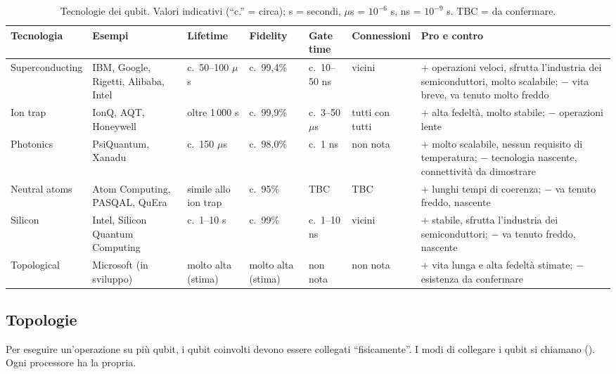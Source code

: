 \begin{table}[ht]
\centering
\footnotesize
\caption{Tecnologie dei qubit. Valori indicativi (``c.'' = circa); s = secondi, $\mu$s = $10^{-6}$ s, ns = $10^{-9}$ s.
TBC = da confermare.}
\label{tab:qse-tecnologie}
\begin{tabularx}{\linewidth}{>{\raggedright\arraybackslash}p{1.75cm}>{\raggedright\arraybackslash}p{1.8cm}>{\raggedright\arraybackslash}p{1.25cm}>{\raggedright\arraybackslash}p{1.05cm}>{\raggedright\arraybackslash}p{1.1cm}>{\raggedright\arraybackslash}p{1.15cm}>{\raggedright\arraybackslash}X}
\toprule
Tecnologia & Esempi & Lifetime & Fidelity & Gate time & Connes\-sioni & Pro e contro \\
\midrule
Supercon\-ducting & IBM, Google, Rigetti, Alibaba, Intel & c.\ 50--100 $\mu$s & c.\ 99,4\% & c.\ 10--50 ns & vicini &
  + operazioni veloci, sfrutta l'industria dei semiconduttori, molto scalabile; $-$ vita breve, va tenuto molto freddo \\
Ion trap & IonQ, AQT, Honeywell & oltre 1\,000 s & c.\ 99,9\% & c.\ 3--50 $\mu$s & tutti con tutti &
  + alta fedeltà, molto stabile; $-$ operazioni lente \\
Photonics & PsiQuantum, Xanadu & c.\ 150 $\mu$s & c.\ 98,0\% & c.\ 1 ns & non nota &
  + molto scalabile, nessun requisito di temperatura; $-$ tecnologia nascente, connettività da dimostrare \\
Neutral atoms & Atom Computing, PASQAL, QuEra & simile allo ion trap & c.\ 95\% & TBC & TBC &
  + lunghi tempi di coerenza; $-$ va tenuto freddo, nascente \\
Silicon & Intel, Silicon Quantum Computing & c.\ 1--10 s & c.\ 99\% & c.\ 1--10 ns & vicini &
  + stabile, sfrutta l'industria dei semiconduttori; $-$ va tenuto freddo, nascente \\
Topological & Microsoft (in sviluppo) & molto alta (stima) & molto alta (stima) & non nota & non nota &
  + vita lunga e alta fedeltà stimate; $-$ esistenza da confermare \\
\bottomrule
\end{tabularx}
\end{table}

\subsection{Topologie}
\label{sec:qse-topologie}

Per eseguire un'operazione su più qubit, i qubit coinvolti devono essere collegati ``fisicamente''. I modi di
collegare i qubit si chiamano  (). Ogni processore ha la propria.

